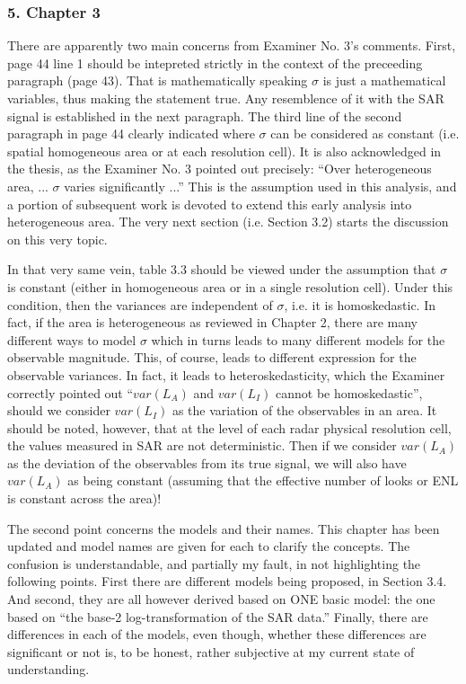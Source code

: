 \subsubsection*{5. Chapter 3}

There are apparently two main concerns from Examiner No. 3's comments.
First, page 44 line 1 should be intepreted strictly in the context of the preceeding paragraph (page 43). 
That is mathematically  speaking $\sigma$ is just a mathematical variables, thus making the statement true. 
Any resemblence of it with the SAR signal is established in the next paragraph.
The third line of the second paragraph in page 44 clearly indicated where $\sigma$ can be considered as constant (i.e. spatial homogeneous area or at each resolution cell).
It is also acknowledged in the thesis, as the Examiner No. 3 pointed out precisely: ``Over heterogeneous area, ... $\sigma$ varies significantly ...''
This is the assumption used in this analysis, 
  and a portion of subsequent work is devoted to extend this early analysis into heterogeneous area.
The very next section (i.e. Section 3.2) starts the discussion on this very topic.  

In that very same vein, table 3.3 should be viewed under the assumption that $\sigma$ is constant (either in homogeneous area or in a single resolution cell).
Under this condition, then the variances are independent of $\sigma$, i.e. it is homoskedastic.
In fact, if the area is heterogeneous as reviewed in Chapter 2, there are many different ways to model $\sigma$ which in turns leads to many different models for the observable magnitude.
This, of course, leads to different expression for the observable variances.
In fact, it leads to heteroskedasticity, which the Examiner correctly pointed out ``$var(L_A)$ and $var(L_I)$ cannot be homoskedastic'', should we consider $var(L_I)$ as the variation of the observables in an area.
It should be noted, however, that at the level of each radar physical resolution cell, the values measured in SAR are not deterministic.
Then if we consider $var(L_A)$ as the deviation of the observables from its true signal, we will also have $var(L_A)$ as being constant (assuming that the effective number of looks or ENL is constant across the area)!

The second point concerns the models and their names.
This chapter has been updated and model names are given for each to clarify the concepts.
The confusion is understandable, and partially my fault, in not highlighting the following points.
First there are different models being proposed, in Section 3.4.
And second, they are all however derived based on ONE basic model: the one based on ``the base-2 log-transformation of the SAR data.''
Finally, there are differences in each of the models, even though, whether these differences are significant or not is, to be honest, rather subjective at my current state of understanding.

